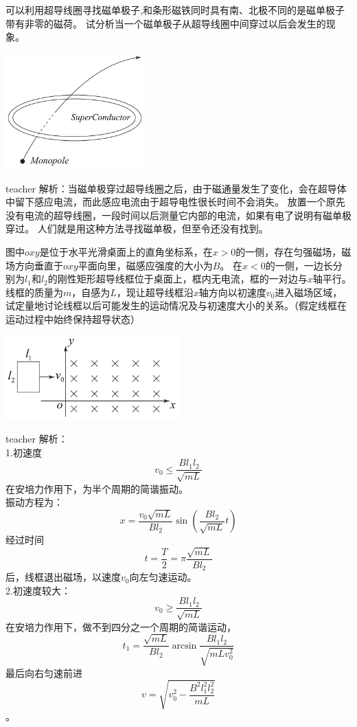\begin{example}
可以利用超导线圈寻找{\heiti 磁单极子},和条形磁铁同时具有南、北极不同的是磁单极子带有非零的磁荷。
试分析当一个磁单极子从超导线圈中间穿过以后会发生的现象。
\begin{flushright}
\includegraphics[width = 0.4\textwidth]{images/mag-41.pdf} 
\end{flushright}
\begin{taggedblock}{teacher}
\noindent
解析：当磁单极穿过超导线圈之后，由于磁通量发生了变化，会在超导体中留下感应电流，而此感应电流由于超导电性很长时间不会消失。
放置一个原先没有电流的超导线圈，一段时间以后测量它内部的电流，如果有电了说明有磁单极穿过。
人们就是用这种方法寻找磁单极，但至令还没有找到。
\end{taggedblock}
\end{example}

\begin{example}
图中$oxy$是位于水平光滑桌面上的直角坐标系，在$x>0$的一侧，存在匀强磁场，磁场方向垂直于$oxy$平面向里，磁感应强度的大小为$B$。
在$x<0$的一侧，一边长分别为$l_1$和$l_2$的刚性矩形超导线框位于桌面上，框内无电流，框的一对边与$x$轴平行。
线框的质量为$m$，自感为$L$，现让超导线框沿$x$轴方向以初速度$v_0$进入磁场区域，试定量地讨论线框以后可能发生的运动情况及与初速度大小的关系。（假定线框在运动过程中始终保持超导状态）
\begin{flushright}
\includegraphics[width = 0.5\textwidth]{images/mag-24.pdf} 
\end{flushright}
\begin{taggedblock}{teacher}
\noindent
解析：
\\1.初速度\[v_0\le\frac{Bl_1l_2}{\sqrt{mL}}\]
在安培力作用下，为半个周期的简谐振动。
\\振动方程为：\[x=\frac{v_0\sqrt{mL}}{Bl_2}\sin(\frac{Bl_2}{\sqrt{mL}}t)\]
经过时间\[t=\frac{T}{2}=\pi\frac{\sqrt{mL}}{Bl_2}\]后，线框退出磁场，以速度$v_0$向左匀速运动。
\\2.初速度较大：\[v_0\ge\frac{Bl_1l_2}{\sqrt{mL}}\]
在安培力作用下，做不到四分之一个周期的简谐运动，
\[t_1=\frac{\sqrt{mL}}{Bl_2}\arcsin\frac{Bl_1l_2}{\sqrt{mLv_0^2}}\]
最后向右匀速前进\[v=\sqrt{v_0^2-\frac{B^2l_1^2l_2^2}{mL}}\]。
\end{taggedblock}
\end{example}


